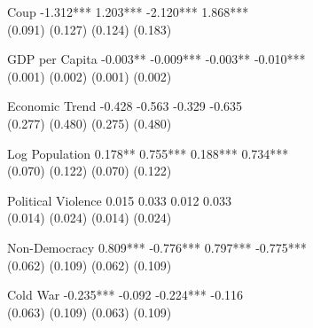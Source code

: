 \documentclass[
  12pt,
]{report}
\begin{document}
Coup -1.312*** 1.203*** -2.120*** 1.868***\\
(0.091) (0.127) (0.124) (0.183)

GDP per Capita -0.003** -0.009*** -0.003** -0.010***\\
(0.001) (0.002) (0.001) (0.002)

Economic Trend -0.428 -0.563 -0.329 -0.635\\
(0.277) (0.480) (0.275) (0.480)

Log Population 0.178** 0.755*** 0.188*** 0.734***\\
(0.070) (0.122) (0.070) (0.122)

Political Violence 0.015 0.033 0.012 0.033\\
(0.014) (0.024) (0.014) (0.024)

Non-Democracy 0.809*** -0.776*** 0.797*** -0.775***\\
(0.062) (0.109) (0.062) (0.109)

Cold War -0.235*** -0.092 -0.224*** -0.116\\
(0.063) (0.109) (0.063) (0.109)
\end{document}
